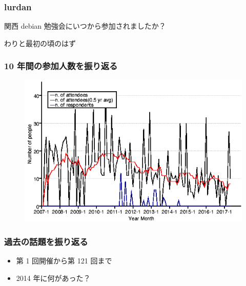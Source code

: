 \documentclass[cjk,dvipdfmx,10pt,compress,%
hyperref={bookmarks=true,bookmarksnumbered=true,bookmarksopen=false,%
colorlinks=false,%
pdftitle={第 121 回 関西 Debian 勉強会},%
pdfauthor={倉敷・のがた・佐々木・かわだ},%
pdfsubject={資料},%
}]{beamer}
\begin{document}
\begin{frame}[fragile]
  \frametitle{lurdan}
    \begin{block}{関西 debian 勉強会にいつから参加されましたか？}
        \begin{description}
            \item わりと最初の頃のはず
        \end{description}
    \end{block}
\end{frame}








\begin{frame}[fragile]
  \frametitle{10 年間の参加人数を振り返る}
  \begin{figure}
    \includegraphics[scale=0.5]{image201703-kansai/memberanalysis/kansai.png}
  \end{figure}
\end{frame}

\begin{frame}[fragile]
  \frametitle{過去の話題を振り返る}
   \begin{itemize} 
    \item 第 1 回開催から第 121 回まで
    \item 2014 年に何があった？
   \end{itemize} 
\end{frame}
\end{document}
